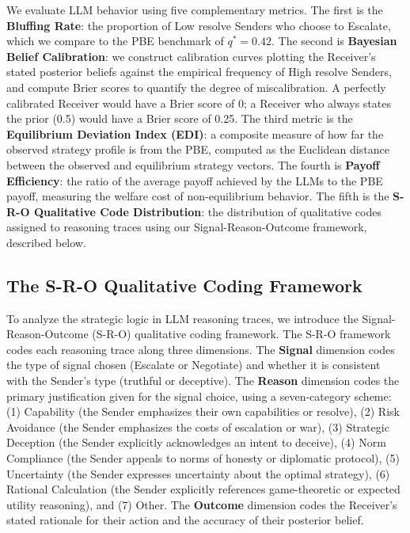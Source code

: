 \documentclass[12pt]{article}
\theoremstyle{plain}
\theoremstyle{definition}
\begin{document}
We evaluate LLM behavior using five complementary metrics. The first is the \textbf{Bluffing Rate}: the proportion of Low resolve Senders who choose to Escalate, which we compare to the PBE benchmark of $q^* = 0.42$. The second is \textbf{Bayesian Belief Calibration}: we construct calibration curves plotting the Receiver's stated posterior beliefs against the empirical frequency of High resolve Senders, and compute Brier scores to quantify the degree of miscalibration. A perfectly calibrated Receiver would have a Brier score of 0; a Receiver who always states the prior (0.5) would have a Brier score of 0.25. The third metric is the \textbf{Equilibrium Deviation Index (EDI)}: a composite measure of how far the observed strategy profile is from the PBE, computed as the Euclidean distance between the observed and equilibrium strategy vectors. The fourth is \textbf{Payoff Efficiency}: the ratio of the average payoff achieved by the LLMs to the PBE payoff, measuring the welfare cost of non-equilibrium behavior. The fifth is the \textbf{S-R-O Qualitative Code Distribution}: the distribution of qualitative codes assigned to reasoning traces using our Signal-Reason-Outcome framework, described below.

\subsection{The S-R-O Qualitative Coding Framework}

To analyze the strategic logic in LLM reasoning traces, we introduce the Signal-Reason-Outcome (S-R-O) qualitative coding framework. The S-R-O framework codes each reasoning trace along three dimensions. The \textbf{Signal} dimension codes the type of signal chosen (Escalate or Negotiate) and whether it is consistent with the Sender's type (truthful or deceptive). The \textbf{Reason} dimension codes the primary justification given for the signal choice, using a seven-category scheme: (1) Capability (the Sender emphasizes their own capabilities or resolve), (2) Risk Avoidance (the Sender emphasizes the costs of escalation or war), (3) Strategic Deception (the Sender explicitly acknowledges an intent to deceive), (4) Norm Compliance (the Sender appeals to norms of honesty or diplomatic protocol), (5) Uncertainty (the Sender expresses uncertainty about the optimal strategy), (6) Rational Calculation (the Sender explicitly references game-theoretic or expected utility reasoning), and (7) Other. The \textbf{Outcome} dimension codes the Receiver's stated rationale for their action and the accuracy of their posterior belief.
\end{document}
